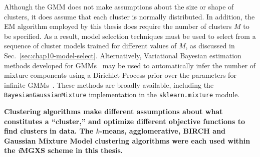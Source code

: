 Although the \ac{GMM} does not make assumptions about the size or shape of clusters, it does assume that each cluster is normally distributed. In addition, the EM algorithm employed by this thesis does require the number of clusters $M$ to be specified. As a result, model selection techniques must be used to select from a sequence of cluster models trained for different values of $M$, as discussed in Sec.~\ref{sec:chap10-model-select}. Alternatively, Variational Bayesian estimation methods developed for \acp{GMM}~\cite{attias2000variational,blei2006variational} may be used to automatically infer the number of mixture components using a Dirichlet Process prior over the parameters for infinite \acp{GMM}~\cite{ferguson1973dirichlet}. These methods are broadly available, including the \texttt{BayesianGaussianMixture} implementation in the \texttt{sklearn.mixture} module.

\begin{emphbox}
\textbf{Clustering algorithms make different assumptions about what constitutes a ``cluster,'' and optimize different objective functions to find clusters in data. The $k$-means, agglomerative, BIRCH and Gaussian Mixture Model clustering algorithms were each used within the \textit{i}\ac{MGXS} scheme in this thesis.}
\end{emphbox}







